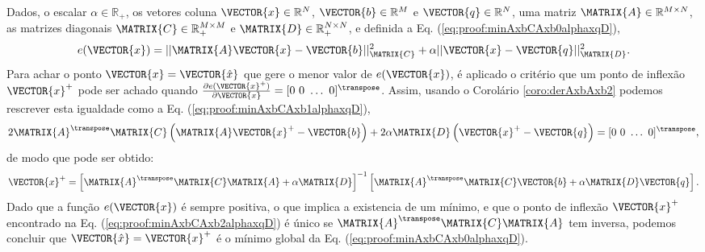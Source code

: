 \begin{myproofT}
\label{proof:theo:minAxbCAxbalphaxqD}
Dados,
o escalar $\alpha \in \mathbb{R}_{+}$,
os vetores coluna $\VECTOR{x}\in \mathbb{R}^N$, $\VECTOR{b}\in \mathbb{R}^M$ e $\VECTOR{q}\in \mathbb{R}^N$,  
uma matriz $\MATRIX{A} \in \mathbb{R}^{M\times N}$, 
as matrizes diagonais $\MATRIX{C} \in \mathbb{R}^{M\times M}_+$ e $\MATRIX{D} \in \mathbb{R}^{N\times N}_+$, e 
definida a Eq. (\ref{eq:proof:minAxbCAxb0alphaxqD}),
\begin{equation}\label{eq:proof:minAxbCAxb0alphaxqD}
e(\VECTOR{x})=||\MATRIX{A}\VECTOR{x}-\VECTOR{b}||_{\MATRIX{C}}^2+\alpha||\VECTOR{x}-\VECTOR{q}||_{\MATRIX{D}}^2.
\end{equation}
Para achar o ponto $\VECTOR{x}=\VECTOR{\hat{x}}$ que gere o menor valor de $e(\VECTOR{x})$, é aplicado
o critério que um ponto de inflexão $\VECTOR{x}^+$ pode ser achado quando 
$\frac{\partial e(\VECTOR{x}^+)}{\partial \VECTOR{x} }=[0~ 0~ \hdots~ 0 ]^{\transpose}$.
Assim, usando o Corolário \ref{coro:derAxbAxb2} podemos 
rescrever esta igualdade como a Eq. (\ref{eq:proof:minAxbCAxb1alphaxqD}),
\begin{equation}\label{eq:proof:minAxbCAxb1alphaxqD}
2 \MATRIX{A}^{\transpose}\MATRIX{C}\left(\MATRIX{A}\VECTOR{x}^+-\VECTOR{b}\right)
+2 \alpha\MATRIX{D}\left(\VECTOR{x}^+-\VECTOR{q}\right)=[0~ 0~ \hdots~ 0 ]^{\transpose},
\end{equation}
de modo que pode ser obtido:
\begin{equation}\label{eq:proof:minAxbCAxb2alphaxqD}
\VECTOR{x}^+=\left[ \MATRIX{A}^{\transpose}\MATRIX{C}\MATRIX{A} +\alpha\MATRIX{D}\right]^{-1} 
\left[ \MATRIX{A}^{\transpose}\MATRIX{C} \VECTOR{b}+\alpha\MATRIX{D}\VECTOR{q}\right].
\end{equation}
Dado que  a função $e(\VECTOR{x})$ é sempre positiva, o que implica a existencia de um mínimo,
e que o ponto de inflexão $\VECTOR{x}^+$ encontrado na Eq. (\ref{eq:proof:minAxbCAxb2alphaxqD}) 
é único se $\MATRIX{A}^{\transpose}\MATRIX{C}\MATRIX{A}$ tem inversa, 
podemos concluir que  $\VECTOR{\hat{x}}=\VECTOR{x}^+$ é o mínimo global da Eq. (\ref{eq:proof:minAxbCAxb0alphaxqD}).
\end{myproofT}

